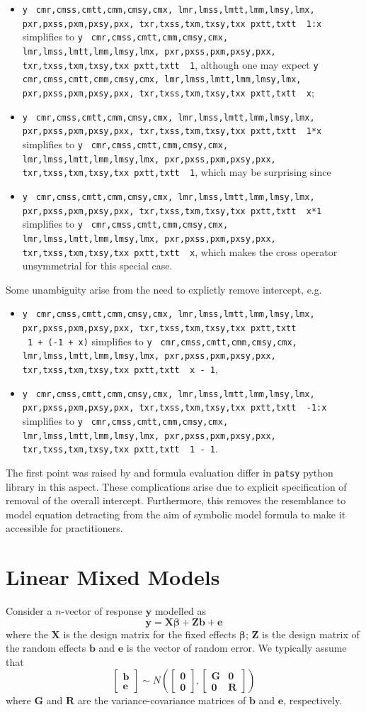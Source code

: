 \documentclass[runningheads]{llncs}
\makeatletter
\providecommand{\tightlist}{%
  \setlength{\itemsep}{0pt}\setlength{\parskip}{0pt}}
\newcommand\midtilde@raisedtilde[1][.5]{\raisebox{#1ex}{\texttildelow}}
\def\midtilde@normaltilde{\texttildelow}
\newcommand\midtilde%
{%
  \expandafter\in@\expandafter{\f@family}%
    {cmr,cmss,cmtt,cmm,cmsy,cmx,%
    lmr,lmss,lmtt,lmm,lmsy,lmx,%
    pxr,pxss,pxm,pxsy,pxx,%
    txr,txss,txm,txsy,txx}%
  \ifin@%
    \midtilde@raisedtilde%
  \else%
    \expandafter\in@\expandafter{\f@family}%
    {pxtt,txtt}%
    \ifin@%
      \midtilde@raisedtilde[.35]%
    \else%
      \midtilde@normaltilde%
    \fi%
  \fi%
}
\makeatother
\begin{document}
\begin{itemize}
\tightlist
\item
  \texttt{y} \texttt{\midtilde\ }\texttt{1:x} simplifies to \texttt{y} \texttt{\midtilde\ }\texttt{1}, although one may expect \texttt{y} \texttt{\midtilde\ }\texttt{x};
\item
  \texttt{y} \texttt{\midtilde\ }\texttt{1*x} simplifies to \texttt{y} \texttt{\midtilde\ }\texttt{1}, which may be surprising since
\item
  \texttt{y} \texttt{\midtilde\ }\texttt{x*1} simplifies to \texttt{y} \texttt{\midtilde\ }\texttt{x}, which makes the cross operator unsymmetrial for this special case.
\end{itemize}

Some unambiguity arise from the need to explictly remove intercept, e.g.

\begin{itemize}
\tightlist
\item
  \texttt{y} \texttt{\midtilde\ }\texttt{1\ +\ (-1\ +\ x)} simplifies to \texttt{y} \texttt{\midtilde\ }\texttt{x\ -\ 1},
\item
  \texttt{y} \texttt{\midtilde\ }\texttt{-1:x} simplifies to \texttt{y} \texttt{\midtilde\ }\texttt{1\ -\ 1}.
\end{itemize}

The first point was raised by \textcite{patsy} and formula evaluation differ in \texttt{patsy} python library in this aspect. These complications arise due to explicit specification of removal of the overall intercept. Furthermore, this removes the resemblance to model equation detracting from the aim of symbolic model formula to make it accessible for practitioners.

\hypertarget{lmm}{%
\section{Linear Mixed Models}\label{lmm}}

Consider a \(n\)-vector of response \(\boldsymbol{y}\) modelled as
\begin{equation}
\boldsymbol{y} = \mathbf{X}\boldsymbol{\beta} + \mathbf{Z}\boldsymbol{b} + \boldsymbol{e}
\label{eq:lmm}
\end{equation}
where the \(\mathbf{X}\) is the design matrix for the fixed effects \(\boldsymbol{\beta}\); \(\mathbf{Z}\) is the design matrix of the random effects \(\boldsymbol{b}\) and \(\boldsymbol{e}\) is the vector of random error. We typically assume that
\[\begin{bmatrix}\boldsymbol{b}\\\boldsymbol{e}\end{bmatrix}\sim N\left(\begin{bmatrix}\boldsymbol{0}\\\boldsymbol{0}\end{bmatrix}, \begin{bmatrix}\mathbf{G} & \mathbf{0} \\ \mathbf{0} & \mathbf{R} \end{bmatrix}\right)\]
where \(\mathbf{G}\) and \(\mathbf{R}\) are the variance-covariance matrices of \(\boldsymbol{b}\) and \(\boldsymbol{e}\), respectively.
\end{document}
